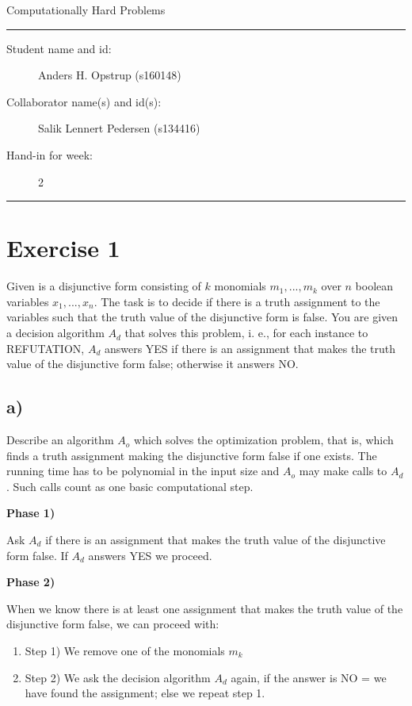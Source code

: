 \documentclass[11pt]{article}
\begin{document}
\begin{center}
{{\Large \sc Computationally Hard Problems}}
\end{center}
\rule{\textwidth}{1pt}
\begin{description}
\item[Student name and id:] Anders H. Opstrup (s160148)
\item[Collaborator name(s) and id(s):] Salik Lennert Pedersen (s134416)
\item[Hand-in for week:] 2
\end{description}
\rule{\textwidth}{1pt}


\section*{Exercise 1}
Given is a disjunctive form consisting of $k$ monomials $m_{1}, . . . , m_{k}$ over $n$ boolean variables $x_{1}, . . . , x_{n}$. The task is to decide if there is a truth assignment to the variables such that the truth value of the disjunctive form is false.
\newline \newline
You are given a decision algorithm $A_{d}$ that solves this problem, i. e., for each instance to REFUTATION, $A_{d}$ answers YES if there is an assignment that makes the truth value of the disjunctive form false; otherwise it answers NO.

\subsection*{a)}
Describe an algorithm $A_{o}$ which solves the optimization problem, that is, which finds a truth assignment making the disjunctive form false if one exists. The running time has to be polynomial in the input size and $A_{o}$ may make calls to $A_{d}$. Such calls count as one basic computational step. \newline

\textbf{Phase 1)} \newline

Ask $A_{d}$ if there is an assignment that makes the truth value of the disjunctive form false. If $A_{d}$ answers YES we proceed. \newline

\textbf{Phase 2)} \newline

When we know there is at least one assignment that makes the truth value of the disjunctive form false, we can proceed with:
\begin{enumerate}
	\item Step 1) We remove one of the monomials $m_{k}$
	\item Step 2) We ask the decision algorithm $A_{d}$ again, if the answer is NO = we have found the assignment; else we repeat step 1.
\end{enumerate}
\end{document}
